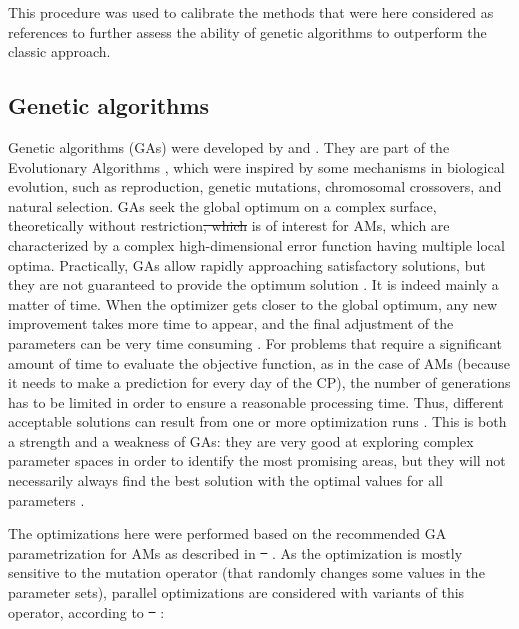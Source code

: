 \documentclass[review]{elsarticle}
\providecommand{\DIFaddtex}[1]{{\protect\color{blue}\uwave{#1}}} %
\providecommand{\DIFdeltex}[1]{{\protect\color{red}\sout{#1}}}                      %
\providecommand{\DIFaddbegin}{} %
\providecommand{\DIFaddend}{} %
\providecommand{\DIFdelbegin}{} %
\providecommand{\DIFdelend}{} %
\providecommand{\DIFadd}[1]{\texorpdfstring{\DIFaddtex{#1}}{#1}} %
\providecommand{\DIFdel}[1]{\texorpdfstring{\DIFdeltex{#1}}{}} %
\begin{document}
This procedure was used to calibrate the methods that were here considered as references to further assess the ability of genetic algorithms to outperform the classic approach.


\subsection{Genetic algorithms}
\label{sec:gas}

Genetic algorithms (GAs) were developed by \citet{Holland1992b} and \citet{Goldberg1989}. They are part of the Evolutionary Algorithms \citep{Back1993b, Schwefel1993}, which were inspired by some mechanisms in biological evolution, such as reproduction, genetic mutations, chromosomal crossovers, and natural selection. GAs seek the global optimum on a complex surface, theoretically without restriction\DIFdelbegin \DIFdel{, which }\DIFdelend \DIFaddbegin \DIFadd{. This }\DIFaddend is of interest for AMs, which are characterized by a complex high-dimensional error function having multiple local optima. Practically, GAs allow rapidly approaching satisfactory solutions, but they are not guaranteed to provide the optimum solution \citep{Zitzler2004a}. It is indeed mainly a matter of time. When the optimizer gets closer to the global optimum, any new improvement takes more time to appear, and the final adjustment of the parameters can be very time consuming \citep{Back1993a}. For problems that require a significant amount of time to evaluate the objective function, as in the case of AMs (because it needs to make a prediction for every day of the CP), the number of generations has to be limited in order to ensure a reasonable processing time. Thus, different acceptable solutions can result from one or more optimization runs \citep{Holland1992b}. This is both a strength and a weakness of GAs: they are very good at exploring complex parameter spaces in order to identify the most promising areas, but they will not necessarily always find the best solution with the optimal values for all parameters \citep{Holland1992b}.

The optimizations here were performed based on the recommended GA parametrization for AMs as described in \DIFdelbegin \DIFdel{\mbox{%
\citet{Horton2016}}%
}\DIFdelend \DIFaddbegin \DIFadd{\mbox{%
\citet{Horton2017}}%
}\DIFaddend . As the optimization is mostly sensitive to the mutation operator (that randomly changes some values in the parameter sets), parallel optimizations are considered with variants of this operator, according to \DIFdelbegin \DIFdel{\mbox{%
\citet{Horton2016}}%
}\DIFdelend \DIFaddbegin \DIFadd{\mbox{%
\citet{Horton2017}}%
}\DIFaddend :
\end{document}
